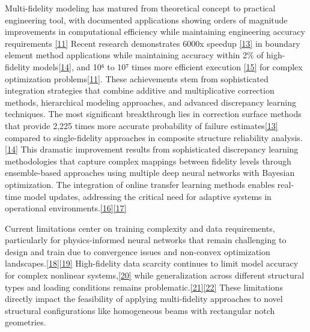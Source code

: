 \documentclass[12pt,a4paper]{report}
\begin{document}
Multi-fidelity modeling has matured from theoretical concept to practical engineering tool, with documented applications showing orders of magnitude improvements in computational efficiency while maintaining engineering accuracy requirements \href{https://doi.org/10.3934/acse.2023015}{[11]} Recent research demonstrates 6000x speedup \href{https://doi.org/10.1007/s00366-020-01084-x}{[13]} in boundary element method applications while maintaining accuracy within 2\% of high-fidelity models\href{https://doi.org/10.1016/j.enganabound.2019.03.036}{[14]}, and 10⁶ to 10⁷ times more efficient execution \href{https://doi.org/10.1103/PhysRevAccelBeams.23.044601}{[15]}  for complex optimization problems\href{https://doi.org/10.1016/j.engstruct.2023.117307}{[11]}. These achievements stem from sophisticated integration strategies that combine additive and multiplicative correction methods, hierarchical modeling approaches, and advanced discrepancy learning techniques.
The most significant breakthrough lies in correction surface methods that provide 2,225 times more accurate probability of failure estimates\href{https://doi.org/10.1007/s00366-020-01084-x}{[13]} compared to single-fidelity approaches in composite structure reliability analysis.\href{https://doi.org/10.1016/j.enganabound.2019.03.036}{[14]} This dramatic improvement results from sophisticated discrepancy learning methodologies that capture complex mappings between fidelity levels through ensemble-based approaches using multiple deep neural networks with Bayesian optimization. The integration of online transfer learning methods enables real-time model updates, addressing the critical need for adaptive systems in operational environments.\href{https://doi.org/10.1016/j.aei.2022.101689}{[16]}\href{http://dx.doi.org/10.3390/ecsa-9-13344}{[17]}

Current limitations center on training complexity and data requirements, particularly for physics-informed neural networks that remain challenging to design and train due to convergence issues and non-convex optimization landscapes.\href{https://doi.org/10.1016/j.jcp.2020.109942}{[18]}\href{https://doi.org/10.1007/s10915-022-01939-z}{[19]} High-fidelity data scarcity continues to limit model accuracy for complex nonlinear systems,\href{https://doi.org/10.1002/prep.202400248}{[20]}  while generalization across different structural types and loading conditions remains problematic.\href{http://dx.doi.org/10.2139/ssrn.4332506}{[21]}\href{http://dx.doi.org/10.3390/ecsa-9-13344}{[22]} These limitations directly impact the feasibility of applying multi-fidelity approaches to novel structural configurations like homogeneous beams with rectangular notch geometries.
\end{document}

